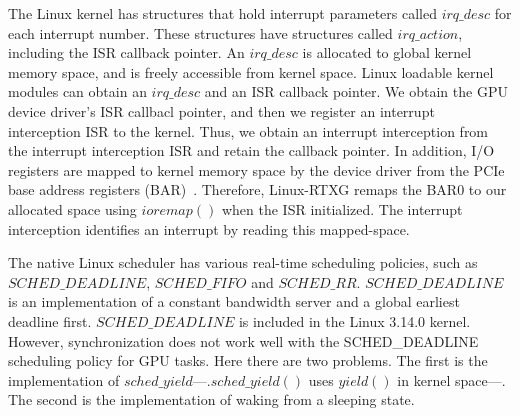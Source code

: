 The Linux kernel has structures that hold interrupt parameters called $irq\_desc$ for each interrupt number.
These structures have structures called $irq\_action$, including the ISR callback pointer.
An $irq\_desc$ is allocated to global kernel memory space, and is freely accessible from kernel space.
Linux loadable kernel modules can obtain an $irq\_desc$ and an ISR callback pointer.
We obtain the GPU device driver's ISR callbacl pointer, and then we register an interrupt interception ISR to the kernel.
Thus, we obtain an interrupt interception from the interrupt interception ISR and retain the callback pointer.
In addition, I/O registers are mapped to kernel memory space by the device driver from the PCIe base address registers (BAR)~\cite{fujii:icpads2013,kato2013zero}.
Therefore, Linux-RTXG remaps the BAR0 to our allocated space using $ioremap()$ when the ISR initialized.
The interrupt interception identifies an interrupt by reading this mapped-space.

The native Linux scheduler has various real-time scheduling policies, such as $SCHED\_DEADLINE$, $SCHED\_FIFO$ and $SCHED\_RR$.
$SCHED\_DEADLINE$ is an implementation of a constant bandwidth server and a global earliest deadline first.
$SCHED\_DEADLINE$ is included in the Linux 3.14.0 kernel.
However, synchronization does not work well with the SCHED\_DEADLINE scheduling policy for GPU tasks.
Here there are two problems.
The first is the implementation of $sched\_yield$---.$sched\_yield()$ uses $yield()$ in kernel space---.
The second is the implementation of waking from a sleeping state.

